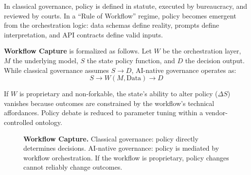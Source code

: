 \documentclass[11pt,a4paper]{article}
\theoremstyle{definition}
\begin{document}
In classical governance, policy is defined in statute, executed by bureaucracy, and reviewed by courts. In a ``Rule of Workflow'' regime, policy becomes emergent from the orchestration logic: data schemas define reality, prompts define interpretation, and API contracts define valid inputs.

\textbf{Workflow Capture} is formalized as follows. Let $W$ be the orchestration layer, $M$ the underlying model, $S$ the state policy function, and $D$ the decision output. While classical governance assumes $S \rightarrow D$, AI-native governance operates as:
\begin{equation}
S \rightarrow W(M, \text{Data}) \rightarrow D
\end{equation}

If $W$ is proprietary and non-forkable, the state's ability to alter policy ($\Delta S$) vanishes because outcomes are constrained by the workflow's technical affordances. Policy debate is reduced to parameter tuning within a vendor-controlled ontology.

\begin{figure}[htbp]
\centering
{}
\caption{\textbf{Workflow Capture.} Classical governance: policy directly determines decisions. AI-native governance: policy is mediated by workflow orchestration. If the workflow is proprietary, policy changes cannot reliably change outcomes.}
\label{fig:workflow-capture}
\end{figure}
\end{document}
